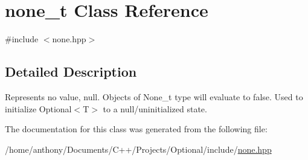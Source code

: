 \hypertarget{classnone__t}{}\section{none\+\_\+t Class Reference}
\label{classnone__t}


{\ttfamily \#include $<$none.\+hpp$>$}



\subsection{Detailed Description}
Represents \textquotesingle{}no value\textquotesingle{}, null. Objects of None\+\_\+t type will evaluate to false. Used to initialize Optional$<$\+T$>$ to a null/uninitialized state. 

The documentation for this class was generated from the following file\+:\begin{DoxyCompactItemize}
\item 
/home/anthony/\+Documents/\+C++/\+Projects/\+Optional/include/\hyperlink{none_8hpp}{none.\+hpp}\end{DoxyCompactItemize}
